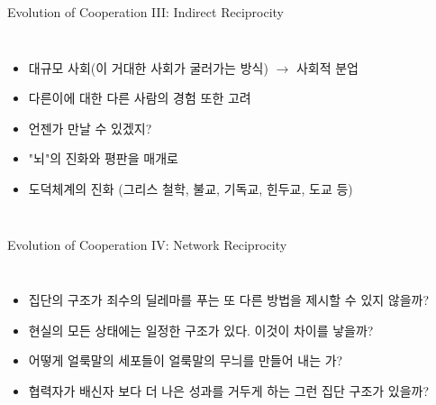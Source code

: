 \documentclass[final]{beamer}
\begin{document}
\begin{frame}[t]{Evolution of Cooperation III: Indirect Reciprocity}
	\begin{columns}[c]
	\column{20em}
	\begin{itemize}
	\item 대규모 사회(이 거대한 사회가 굴러가는 방식) $\rightarrow$ 사회적 분업 
	\item 다른이에 대한 다른 사람의 경험 또한 고려 
	\item 언젠가 만날 수 있겠지? 
	\item "뇌"의 진화와 평판을 매개로
	\item 도덕체계의 진화 (그리스 철학, 불교, 기독교, 힌두교, 도교 등)
	\end{itemize}
	\column{12em}
	\end{columns}
\end{frame}

\begin{frame}[t]{Evolution of Cooperation IV: Network Reciprocity}
	\begin{columns}[c]
	\column{20em}
	\begin{itemize}
	\item 집단의 구조가 죄수의 딜레마를 푸는 또 다른 방법을 제시할 수 있지 않을까? 
	\item 현실의 모든 상태에는 일정한 구조가 있다. 이것이 차이를 낳을까?
	\item 어떻게 얼룩말의 세포들이 얼룩말의 무늬를 만들어 내는 가? 
	\item 협력자가 배신자 보다 더 나은 성과를 거두게 하는 그런 집단 구조가 있을까?
	\end{itemize}
	\column{12em}
	\end{columns}
\end{frame}
\end{document}
